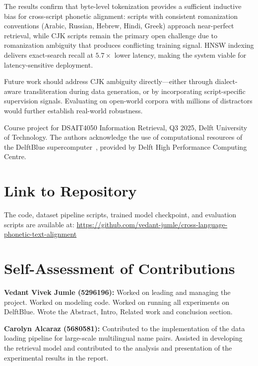 \documentclass[sigconf]{acmart}
\begin{document}
The results confirm that byte-level tokenization provides a sufficient inductive bias for
cross-script phonetic alignment: scripts with consistent romanization conventions (Arabic,
Russian, Hebrew, Hindi, Greek) approach near-perfect retrieval, while CJK scripts remain
the primary open challenge due to romanization ambiguity that produces conflicting training
signal. HNSW indexing delivers exact-search recall at $5.7\times$ lower latency, making
the system viable for latency-sensitive deployment.

Future work should address CJK ambiguity directly---either through dialect-aware
transliteration during data generation, or by incorporating script-specific supervision
signals. Evaluating on open-world corpora with millions of distractors would further
establish real-world robustness.

\begin{acks}
Course project for DSAIT4050 Information Retrieval, Q3 2025, Delft University of Technology.
The authors acknowledge the use of computational resources of the DelftBlue supercomputer~\cite{DHPC2024}, provided by Delft High Performance Computing Centre.
\end{acks}





\section*{Link to Repository}

The code, dataset pipeline scripts, trained model checkpoint, and evaluation scripts are available at:
\url{https://github.com/vedant-jumle/cross-language-phonetic-text-alignment}

\section*{Self-Assessment of Contributions}


\noindent\textbf{Vedant Vivek Jumle (5296196):} Worked on leading and managing the project. Worked on modeling code. Worked on running all experiments on DelftBlue. Wrote the Abstract, Intro, Related work and conclusion section.

\noindent\textbf{Carolyn Alcaraz (5680581):} Contributed to the implementation of the data loading pipeline for large-scale multilingual name pairs. Assisted in developing the retrieval model and contributed to the analysis and presentation of the experimental results in the report.  
\end{document}

